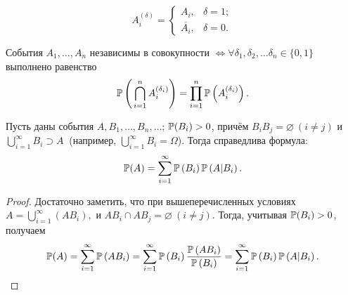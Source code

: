 \begin{symb}
	\begin{equation*}
		A_{i}^{(\delta)} =
		\begin{cases}
			A_{i},            & \delta = 1; \\
			\overline{A_{i}}, & \delta = 0. 
		\end{cases}
	\end{equation*}
\end{symb}

\begin{namedthm}
	События $A_1, \ldots, A_n$ независимы в совокупности $\iff \forall \delta_1, \delta_2, \ldots \delta_n \in \{0, 1\}$ выполнено равенство
	\begin{equation*}
		\operatorname{\mathbb{P}}\left(\, \bigcap_{i=1}^{n} A_{i}^{\left( \delta_{i} \right)} \right)
		= \prod_{i=1}^{n}\operatorname{\mathbb{P}}\left( A_{i}^{\left(\delta_{i}\right)} \right).
	\end{equation*}
\end{namedthm}

\begin{namedthm}
	Пусть даны события $A, B_1, \ldots, B_n, \ldots$; $\operatorname{\mathbb{P}}(B_i) > 0$, причём $B_i B_j = \varnothing~(i \neq j)$ и $\bigcup\limits_{i=1}^{\infty}B_i \supset A~$ (например, $\bigcup\limits_{i=1}^{\infty}B_i = \Omega$). 
	Тогда справедлива формула:
	\begin{equation*}
		\operatorname{\mathbb{P}}(A)=\sum\limits_{i=1}^{\infty} \operatorname{\mathbb{P}}\left(B_{i}\right) \operatorname{\mathbb{P}}\left(A | B_{i}\right).
	\end{equation*}
\end{namedthm}

\begin{proof}
	Достаточно заметить, что при вышеперечисленных условиях $A = \bigcup\limits_{i=1}^{\infty}(AB_i),$ и $AB_i \cap AB_j = \varnothing ~(i \neq j).$ 
	Тогда, учитывая $\operatorname{\mathbb{P}}(B_i) > 0$, получаем
	\begin{equation*}
		\operatorname{\mathbb{P}}(A)=\sum\limits_{i=1}^{\infty} \operatorname{\mathbb{P}}\left(A B_{i}\right)=\sum\limits_{i=1}^{\infty} \operatorname{\mathbb{P}}\left(B_{i}\right) \frac{\operatorname{\mathbb{P}}\left(A B_{i}\right)}{\operatorname{\mathbb{P}}\left(B_{i}\right)}=\sum\limits_{i=1}^{\infty} \operatorname{\mathbb{P}}\left(B_{i}\right) \operatorname{\mathbb{P}}\left(A | B_{i}\right).
	\end{equation*}
\end{proof}

